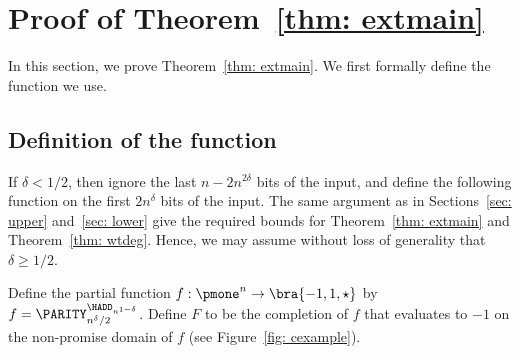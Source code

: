 \section{Proof of Theorem~\ref{thm: extmain}}\label{sec: main}
In this section, we prove Theorem~\ref{thm: extmain}.  We first formally define the function we use.

\subsection{Definition of the function}\label{sec: Fdefn}
If $\delta < 1/2$, then ignore the last $n - 2n^{2\delta}$ bits of the input, and define the following function on the first $2n^{\delta}$ bits of the input. The same argument as in Sections~\ref{sec: upper} and~\ref{sec: lower} give the required bounds for Theorem~\ref{thm: extmain} and Theorem~\ref{thm: wtdeg}.
Hence, we may assume without loss of generality that $\delta \geq 1/2$.

Define the partial function $f : \pmone^n \to \bra{-1, 1, \star}$ by $f = \PARITY_{n^{\delta}/2}^{\HADD_{n^{1 - \delta}}}$.
Define $F$ to be the completion of $f$ that evaluates to $-1$ on the non-promise domain of $f$ (see Figure~\ref{fig: cexample}).




